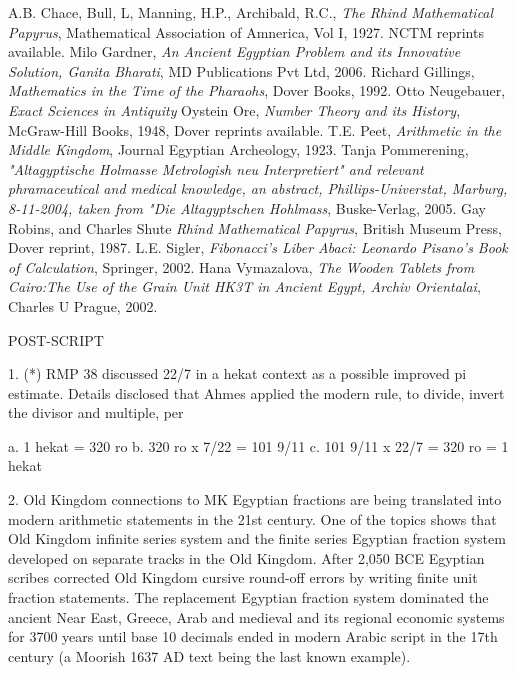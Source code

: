 \documentclass[12pt]{article}
\begin{document}
\begin{thebibliography}{10}
  A.B. Chace, Bull, L, Manning, H.P., Archibald, R.C., \emph{The Rhind Mathematical Papyrus}, Mathematical Association of Amnerica, Vol I, 1927. NCTM reprints available. 
 Milo Gardner, \emph{An Ancient Egyptian Problem and its Innovative Solution, Ganita Bharati}, MD Publications Pvt Ltd, 2006.
Richard Gillings, \emph{Mathematics in the Time of the Pharaohs}, Dover Books, 1992.
 Otto Neugebauer, \emph{Exact Sciences in Antiquity}
 Oystein Ore, \emph{Number Theory and its History}, McGraw-Hill Books, 1948, Dover reprints available.
 T.E. Peet, \emph{Arithmetic in the Middle Kingdom}, Journal Egyptian Archeology, 1923.
 Tanja Pommerening, \emph{"Altagyptische Holmasse Metrologish neu Interpretiert" and relevant phramaceutical and medical knowledge, an abstract,  Phillips-Universtat, Marburg, 8-11-2004, taken from "Die Altagyptschen Hohlmass}, Buske-Verlag, 2005.
 Gay Robins, and Charles Shute \emph{Rhind Mathematical Papyrus}, British Museum Press, Dover reprint, 1987.
 L.E. Sigler, \emph{Fibonacci's Liber Abaci: Leonardo Pisano's Book of Calculation}, Springer, 2002.
 Hana Vymazalova, \emph{The Wooden Tablets from Cairo:The Use of the Grain Unit HK3T in Ancient Egypt, Archiv Orientalai}, Charles U Prague, 2002.
\end{thebibliography}



POST-SCRIPT

1. (*) RMP 38 discussed 22/7 in a hekat context as a possible improved pi estimate. Details disclosed that Ahmes applied the modern rule, to divide, invert the divisor and multiple, per

a. 1 hekat = 320 ro 
b. 320 ro x 7/22 = 101 9/11
c. 101 9/11 x 22/7 = 320 ro = 1 hekat

2. Old Kingdom connections to MK Egyptian fractions are being translated into modern arithmetic statements in the 21st century. One of the topics shows that Old Kingdom infinite series system and the finite series Egyptian fraction system developed on separate tracks in the Old Kingdom. After 2,050 BCE Egyptian scribes corrected Old Kingdom cursive round-off  errors by writing finite unit fraction statements. The replacement Egyptian fraction system dominated the ancient Near East, Greece, Arab and medieval and its regional economic systems for 3700 years until base 10 decimals ended in modern Arabic script in the 17th century (a Moorish 1637 AD text being the last known example). 
\end{document}
